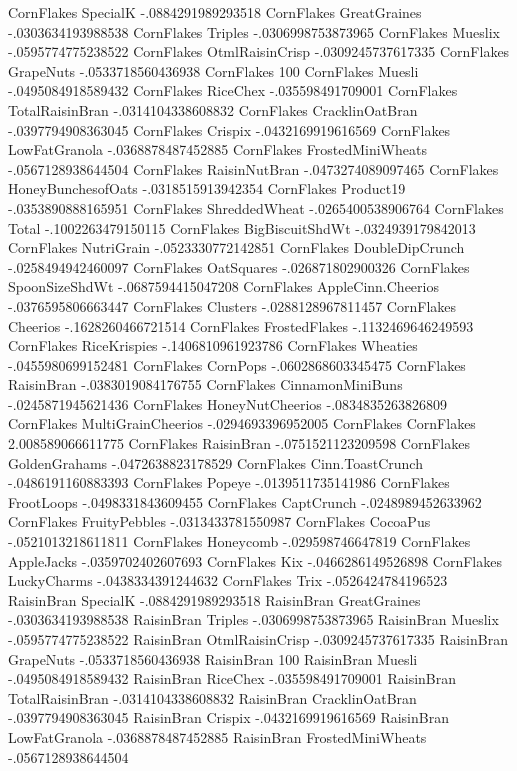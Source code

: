 CornFlakes	SpecialK	-.0884291989293518
CornFlakes	GreatGraines	-.0303634193988538
CornFlakes	Triples	-.0306998753873965
CornFlakes	Mueslix	-.0595774775238522
CornFlakes	OtmlRaisinCrisp	-.0309245737617335
CornFlakes	GrapeNuts	-.0533718560436938
CornFlakes	100%
CornFlakes	Muesli	-.0495084918589432
CornFlakes	RiceChex	-.035598491709001
CornFlakes	TotalRaisinBran	-.0314104338608832
CornFlakes	CracklinOatBran	-.0397794908363045
CornFlakes	Crispix	-.0432169919616569
CornFlakes	LowFatGranola	-.0368878487452885
CornFlakes	FrostedMiniWheats	-.0567128938644504
CornFlakes	RaisinNutBran	-.0473274089097465
CornFlakes	HoneyBunchesofOats	-.0318515913942354
CornFlakes	Product19	-.0353890888165951
CornFlakes	ShreddedWheat	-.0265400538906764
CornFlakes	Total	-.1002263479150115
CornFlakes	BigBiscuitShdWt	-.0324939179842013
CornFlakes	NutriGrain	-.0523330772142851
CornFlakes	DoubleDipCrunch	-.0258494942460097
CornFlakes	OatSquares	-.026871802900326
CornFlakes	SpoonSizeShdWt	-.0687594415047208
CornFlakes	AppleCinn.Cheerios	-.0376595806663447
CornFlakes	Clusters	-.0288128967811457
CornFlakes	Cheerios	-.1628260466721514
CornFlakes	FrostedFlakes	-.1132469646249593
CornFlakes	RiceKrispies	-.1406810961923786
CornFlakes	Wheaties	-.0455980699152481
CornFlakes	CornPops	-.0602868603345475
CornFlakes	RaisinBran	-.0383019084176755
CornFlakes	CinnamonMiniBuns	-.0245871945621436
CornFlakes	HoneyNutCheerios	-.0834835263826809
CornFlakes	MultiGrainCheerios	-.0294693396952005
CornFlakes	CornFlakes	2.008589066611775
CornFlakes	RaisinBran	-.0751521123209598
CornFlakes	GoldenGrahams	-.0472638823178529
CornFlakes	Cinn.ToastCrunch	-.0486191160883393
CornFlakes	Popeye	-.0139511735141986
CornFlakes	FrootLoops	-.0498331843609455
CornFlakes	CaptCrunch	-.0248989452633962
CornFlakes	FruityPebbles	-.0313433781550987
CornFlakes	CocoaPus	-.0521013218611811
CornFlakes	Honeycomb	-.029598746647819
CornFlakes	AppleJacks	-.0359702402607693
CornFlakes	Kix	-.0466286149526898
CornFlakes	LuckyCharms	-.0438334391244632
CornFlakes	Trix	-.0526424784196523
RaisinBran	SpecialK	-.0884291989293518
RaisinBran	GreatGraines	-.0303634193988538
RaisinBran	Triples	-.0306998753873965
RaisinBran	Mueslix	-.0595774775238522
RaisinBran	OtmlRaisinCrisp	-.0309245737617335
RaisinBran	GrapeNuts	-.0533718560436938
RaisinBran	100%
RaisinBran	Muesli	-.0495084918589432
RaisinBran	RiceChex	-.035598491709001
RaisinBran	TotalRaisinBran	-.0314104338608832
RaisinBran	CracklinOatBran	-.0397794908363045
RaisinBran	Crispix	-.0432169919616569
RaisinBran	LowFatGranola	-.0368878487452885
RaisinBran	FrostedMiniWheats	-.0567128938644504
